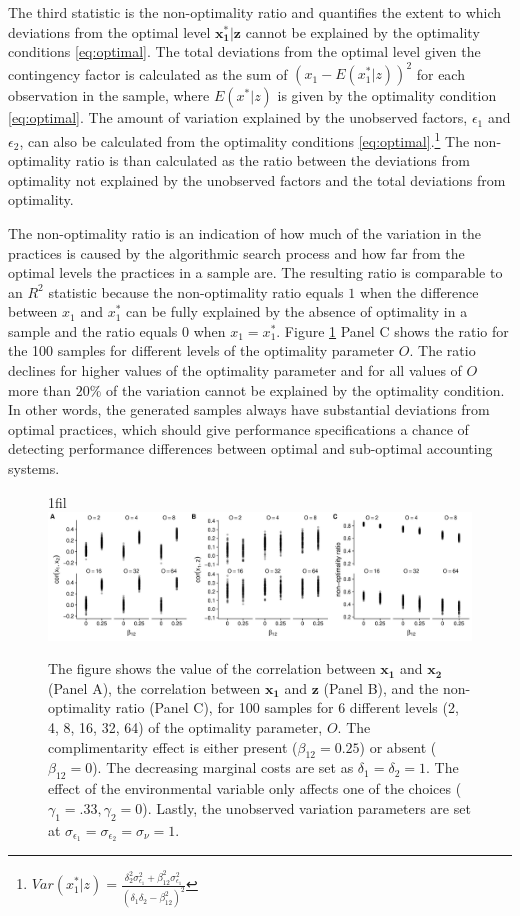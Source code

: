 \documentclass[12pt]{article}
\makeatletter
\newcommand*{\centerfloat}{%
  \parindent \z@
  \leftskip \z@ \@plus 1fil \@minus \textwidth
  \rightskip\leftskip
  \parfillskip \z@skip}
\makeatother
\begin{document}
The third statistic is the non-optimality ratio and quantifies the extent to which deviations from the optimal level $\mathbf{x^*_1|z}$ cannot be explained by the optimality conditions \eqref{eq:optimal}. The total deviations from the optimal level given the contingency factor is calculated as the sum of $(x_1 - E(x_1^*|z))^2$ for each observation in the sample, where $E(x^*|z)$ is given by the optimality condition \eqref{eq:optimal}. The amount of variation explained by the unobserved factors, $\epsilon_1$ and $\epsilon_2$, can also be calculated from the optimality conditions \eqref{eq:optimal}.\footnote{$Var(x_1^*|z) = \frac{\delta_2^2 \sigma_{\epsilon_1}^2 + \beta_{12}^2 \sigma_{\epsilon_1}^2}{(\delta_1 \delta_2 - \beta_{12}^2)^2}$}
The non-optimality ratio is than calculated as the ratio between the deviations from optimality not explained by the unobserved factors and the total deviations from optimality. 

The non-optimality ratio is an indication of how much of the variation in the practices is caused by the algorithmic search process and how far from the optimal levels the practices in a sample are.  The resulting ratio is comparable to an $R^2$ statistic because the non-optimality ratio equals $1$ when the difference between $x_1$ and $x^*_1$ can be fully explained by the absence of optimality in a sample and the ratio equals $0$ when $x_1 = x^*_1$. Figure \ref{calibration} Panel C shows the ratio for the 100 samples for different levels of the optimality parameter $O$. The ratio declines for higher values of the optimality parameter and for all values of $O$ more than $20\%$ of the variation cannot be explained by the optimality condition. In other words, the generated samples always have substantial deviations from optimal practices, which should give performance specifications a chance of detecting performance differences between optimal and sub-optimal accounting systems. 

\begin{figure}
\centerfloat
\includegraphics[width=450px]{figure-latex/sample_descriptives.pdf}
\caption[Calibration of Simulated Samples]{\label{calibration} The figure shows the value of the correlation between $\mathbf{x_1}$ and $\mathbf{x_2}$ (Panel A), the correlation between $\mathbf{x_1}$ and $\mathbf{z}$ (Panel B), and the non-optimality ratio (Panel C),  for 100 samples for 6 different levels (2, 4, 8, 16, 32, 64) of the optimality parameter, $O$. The complimentarity effect is either present ($\beta_{12} = 0.25$) or absent ($\beta_{12} = 0$). The decreasing marginal costs are set as $\delta_1 = \delta_2 = 1$. The effect of the environmental variable only affects one of the choices
($\gamma_1 = .33, \gamma_2 = 0$). Lastly, the unobserved variation parameters are set at $\sigma_{\epsilon_1} = \sigma_{\epsilon_2} = \sigma_{\nu} = 1.$}
\end{figure}
\end{document}
